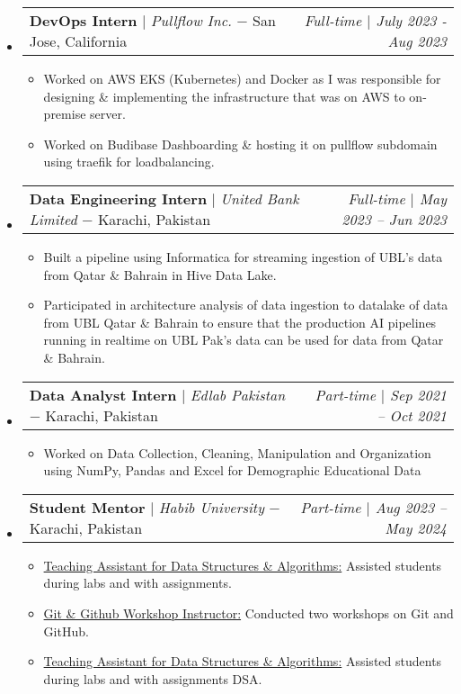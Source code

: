 \documentclass[letterpaper,10pt]{article}
\makeatletter
\newcommand{\subheadingtitlevspace}{
\vspace{-3pt}
}
\newcommand{\resumeItem}[1]{
  \item{
    {#1 \vspace{-4pt}}
  }
}
\newcommand{\titleItem}[1]{
  \textbf{#1}
}
\newcommand{\resumeSubheading}[4]{
  \item
     \begin{tabular*}{0.97\textwidth}[t]{l@{\extracolsep{\fill}}l@{}l}     
      {#1} & \titleItem{#3} | {#2} & \textit{#4}\\
    \end{tabular*}\vspace{-10pt}
}
\newcommand{\resumeProjectHeading}[2]{
    \item
    \begin{tabular*}{0.97\textwidth}{l@{\extracolsep{\fill}}r}
      #1 & \textit{ #2} \\
    \end{tabular*}\vspace{-9pt}
}
\newcommand{\resumeSubHeadingListStart}{\subheadingtitlevspace\begin{itemize}[leftmargin=0.15in, label={}]}
\newcommand{\resumeSubHeadingListEnd}{\end{itemize}}
\newcommand{\resumeItemListStart}{
\begin{itemize}}
\newcommand{\resumeItemListEnd}{
\end{itemize}\vspace{-8pt}}
\makeatother
\begin{document}
\resumeSubHeadingListStart
\resumeProjectHeading
{\titleItem{{DevOps Intern}} $|$ \emph{Pullflow Inc.} $-$ \small{San Jose, California}}{\small{Full-time} $|$ July 2023 - Aug 2023}
\resumeItemListStart
\resumeItem{Worked on AWS EKS (Kubernetes) and Docker as I was responsible for
designing \& implementing the infrastructure that was on AWS to on-premise
server.}
\resumeItem{Worked on Budibase Dashboarding \& hosting it on
pullflow subdomain using traefik for loadbalancing.}
\resumeItemListEnd
\resumeSubHeadingListEnd

\resumeSubHeadingListStart
\resumeProjectHeading
{\titleItem{{Data Engineering Intern}} $|$ \emph{United Bank Limited} $-$ \small{Karachi, Pakistan}}{\small{Full-time} $|$ May 2023 -- Jun 2023}
\resumeItemListStart
\resumeItem{Built a pipeline using Informatica for streaming ingestion
of UBL’s data from Qatar \& Bahrain in Hive Data Lake.}
\resumeItem{Participated in architecture analysis of data ingestion to datalake
of data from UBL Qatar \& Bahrain to ensure that the production AI pipelines
running in realtime on UBL Pak's data can be used for data from Qatar \&
Bahrain.}
\resumeItemListEnd
\resumeSubHeadingListEnd

\resumeSubHeadingListStart
\resumeProjectHeading
{\titleItem{{Data Analyst Intern}} $|$ \emph{Edlab Pakistan} $-$ \small{Karachi, Pakistan}}{\small{Part-time} $|$ Sep 2021 -- Oct 2021}
\resumeItemListStart
\resumeItem{Worked on Data Collection, Cleaning, Manipulation and Organization
using NumPy, Pandas and Excel for Demographic Educational Data}
\resumeItemListEnd
\resumeSubHeadingListEnd

\resumeSubHeadingListStart
\resumeProjectHeading
{\titleItem{{Student Mentor}} $|$ \emph{Habib University} $-$ \small{Karachi, Pakistan}}{\small{Part-time} $|$ Aug 2023 -- May 2024}
\resumeItemListStart
\resumeItem{\underline{Teaching Assistant for Data Structures \& Algorithms:}
Assisted students during labs and with assignments.}
\resumeItem{\underline{Git \& Github Workshop Instructor:} Conducted
two workshops on Git and GitHub.}
\resumeItem{\underline{Teaching Assistant for Data Structures \& Algorithms:}
Assisted students during labs and with assignments DSA.}
\resumeItemListEnd
\resumeSubHeadingListEnd

\end{document}

